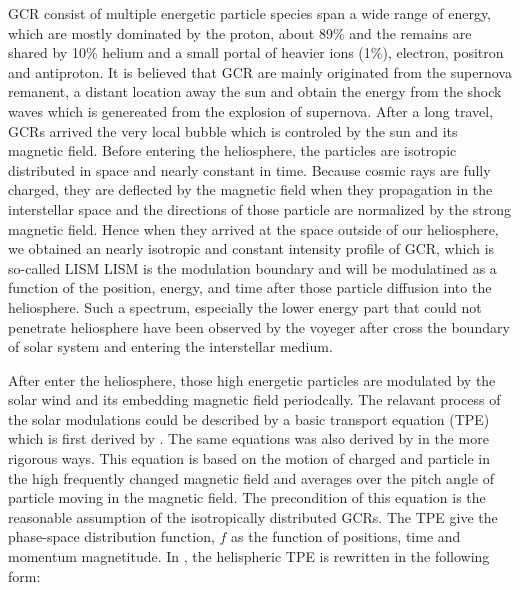 \acs{GCR} consist of multiple energetic particle species span a wide range of energy, which are mostly dominated by the proton, about 89\%  and the remains are shared by 10\% helium and a small portal of heavier ions (1\%), electron, positron and antiproton. 
It is believed that \acs{GCR} are mainly originated from the supernova remanent, a distant location away the sun \citep{Blasi2013AARv2013,Bhattacarjee2000PhR,Fermi1949PhRv} and obtain the energy from the shock waves which is genereated from the explosion of supernova. \citep{blandford1978particle}
After a long travel, \acp{GCR} arrived the very local bubble which is controled by the sun and its magnetic field. Before entering the heliosphere, the particles are isotropic distributed in space and nearly constant in time. Because cosmic rays are fully charged, they are deflected by the magnetic field when they propagation in the interstellar space and the directions of those particle are normalized by the strong magnetic field. Hence when they arrived at the space outside of our heliosphere, we obtained an nearly isotropic and constant intensity profile of \ac{GCR}, which is so-called \ac{LISM} 
\ac{LISM} is the modulation boundary and will be modulatined as a function of the position, energy, and time after those particle diffusion into the heliosphere. Such a spectrum, especially the lower energy part that could not penetrate heliosphere have been observed by the voyeger after cross the boundary of solar system and entering the interstellar medium.\citep{Stone2013Sci, Cummings2016ApJ,Stone2019NatAs}


After enter the heliosphere, those high energetic particles are modulated by the solar wind and its embedding magnetic field periodcally.
The relavant process of the solar modulations could be described by a basic transport equation (TPE) which is first derived by \citet{Parker1965Pss}. The same equations was also derived by \citet{Gleeson1967ApJ} in the more rigorous ways. This equation is based on the motion of charged and particle in the high frequently changed magnetic field and averages over the pitch angle of particle moving in the magnetic field. The precondition of this equation is the reasonable assumption of the isotropically distributed GCRs. The TPE give the phase-space distribution function, $f$ as the function of positions, time and momentum magnetitude. In \citet{Potgieter2013LRSP}, the helispheric TPE is rewritten in the following form:

